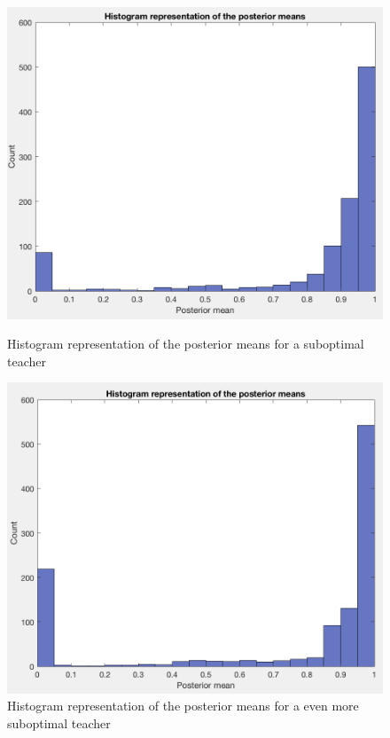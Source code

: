 \documentclass[a4paper]{report}
\begin{document}
{{{{				\begin{figure}[h!]
					\begin{minipage}{0.5\linewidth}
						\begin{center}
							\includegraphics[width=0.95\linewidth]{post_mean_120}
							\caption{Histogram representation of the posterior means for a suboptimal teacher}
							\label{fig::post_mean_120}
						\end{center}
					\end{minipage}
					\begin{minipage}{0.5\linewidth}
						\begin{center}
							\includegraphics[width=0.95\linewidth]{post_mean_50}
							\caption{Histogram representation of the posterior means for a even more suboptimal teacher}
							\label{fig::post_mean_50}
						\end{center}
					\end{minipage}
				\end{figure}
				
}}}}
\end{document}
